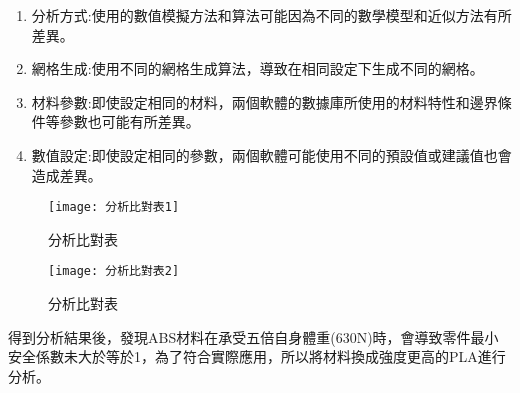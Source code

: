 \begin{enumerate}
\item 分析方式:使用的數值模擬方法和算法可能因為不同的數學模型和近似方法有所差異。
\item 網格生成:使用不同的網格生成算法，導致在相同設定下生成不同的網格。
\item 材料參數:即使設定相同的材料，兩個軟體的數據庫所使用的材料特性和邊界條件等參數也可能有所差異。
\item	數值設定:即使設定相同的參數，兩個軟體可能使用不同的預設值或建議值也會造成差異。\\

\end{enumerate}

\begin{figure}[hbt!]
\center
\texttt{[image: 分析比對表1]}
\caption{\Large 分析比對表}
\label{分析比對表1}
\end{figure}

\begin{figure}[hbt!]
\center
\texttt{[image: 分析比對表2]}
\caption{\Large 分析比對表}
\label{分析比對表2}
\end{figure}

\begin{table}[htb!]
  \center\large
  \caption{\Large ABS最大等效應力(MPa)}
\end{table}   

得到分析結果後，發現ABS材料在承受五倍自身體重(630N)時，會導致零件最小安全係數未大於等於1，為了符合實際應用，所以將材料換成強度更高的PLA進行分析。\\


\begin{table}[htb!]
  \center
  \large
  \caption{\Large PLA最大等效應力(MPa)}
\end{table}

